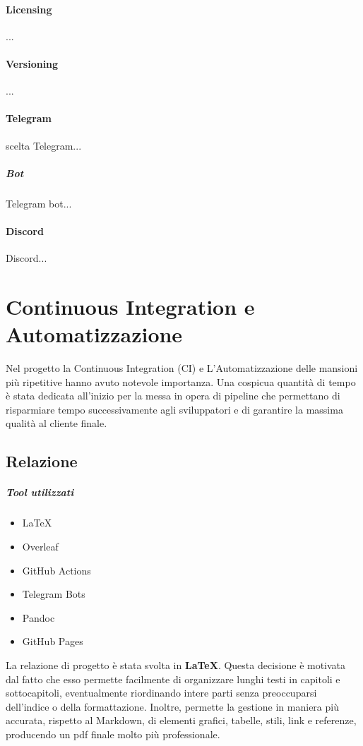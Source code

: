     \paragraph{Licensing} 
    ...
    
    \paragraph{Versioning}
    ...
    
    \paragraph{Telegram}
    scelta Telegram...
        \subparagraph{Bot} 
        Telegram bot...
    
    \paragraph{Discord}
    Discord... 

\section{Continuous Integration e Automatizzazione}
\label{chap:CI}
Nel progetto la Continuous Integration (CI) e L'Automatizzazione delle mansioni più ripetitive hanno avuto notevole importanza. Una cospicua quantità di tempo è stata dedicata all'inizio per la messa in opera di pipeline che permettano di risparmiare tempo successivamente agli sviluppatori e di garantire la massima qualità al cliente finale.
    \subsection{Relazione}
        \subparagraph{Tool utilizzati}
        \begin{itemize}
            \item \LaTeX
            \item Overleaf
            \item GitHub Actions
            \item Telegram Bots
            \item Pandoc
            \item GitHub Pages
        \end{itemize}
        La relazione di progetto è stata svolta in \textbf{\LaTeX}. Questa decisione è motivata dal fatto che esso permette facilmente di organizzare lunghi testi in capitoli e sottocapitoli, eventualmente riordinando intere parti senza preoccuparsi dell'indice o della formattazione. Inoltre, permette la gestione in maniera più accurata, rispetto al Markdown, di elementi grafici, tabelle, stili, link e referenze, producendo un pdf finale molto più professionale. 
        
